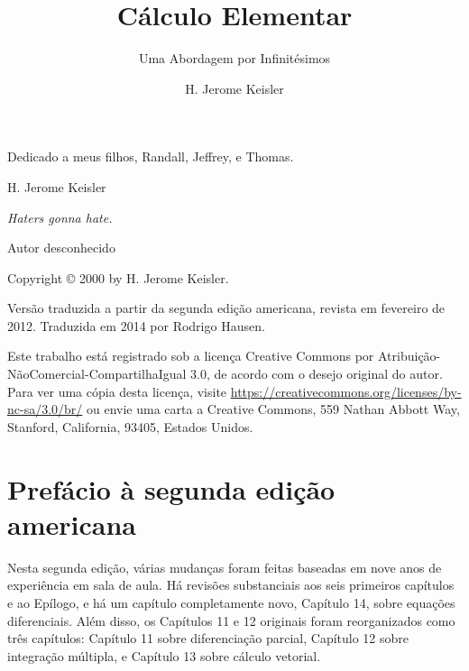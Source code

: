 \documentclass{svmono}
\title{Cálculo Elementar}
\subtitle{Uma Abordagem por Infinitésimos}
\author{H. Jerome Keisler}
\begin{document}
\maketitle

\frontmatter

\newpage

\setcounter{page}{3}

Dedicado a meus filhos, Randall, Jeffrey, e Thomas.

\hfill H. Jerome Keisler

\vfill

\emph{Haters gonna hate.}

\hfill Autor desconhecido

\vfill

Copyright © 2000 by H. Jerome Keisler.

Versão traduzida a partir da segunda edição americana, revista
em fevereiro de 2012. Traduzida em 2014 por Rodrigo Hausen.

Este trabalho está registrado sob a licença Creative Commons
por Atribuição-NãoComercial-CompartilhaIgual 3.0, de acordo
com o desejo original do autor. Para ver uma cópia desta licença,
visite \url{https://creativecommons.org/licenses/by-nc-sa/3.0/br/}
ou envie uma carta a Creative Commons, 559 Nathan
Abbott Way, Stanford, California, 93405, Estados Unidos.

\newpage

\chapter*{Prefácio à segunda edição americana}

Nesta segunda edição, várias mudanças foram feitas baseadas em nove
anos de experiência em sala de aula. Há revisões substanciais aos seis
primeiros capítulos e ao Epílogo, e há um capítulo completamente novo,
Capítulo 14, sobre equações diferenciais. Além disso, os Capítulos 11
e 12 originais foram reorganizados como três capítulos: Capítulo 11
sobre diferenciação parcial, Capítulo 12 sobre integração múltipla, e
Capítulo 13 sobre cálculo vetorial.
\end{document}
